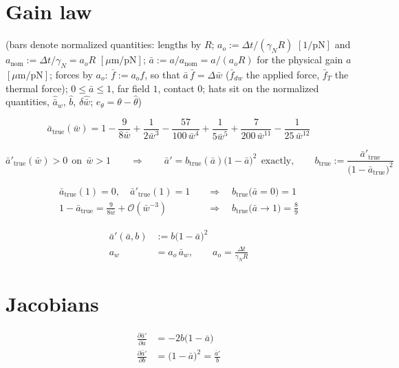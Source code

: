 \documentclass[11pt,a4paper,fontset=none]{ctexart}
\newcommand{\ba}{\bar{a}}
\newcommand{\bw}{\bar{w}}
\begin{document}
\section{Gain law}

(bars denote normalized quantities: lengths by $R$;
$a_o := \Delta t/(\gamma_N R)$ $[1/\mathrm{pN}]$ and
$a_{\mathrm{nom}} := \Delta t/\gamma_N = a_o R$ $[\mu\mathrm{m}/\mathrm{pN}]$;
$\ba := a/a_{\mathrm{nom}} = a/(a_o R)$ for the physical gain
$a$ $[\mu\mathrm{m}/\mathrm{pN}]$;
forces by $a_o$: $\bar{f} := a_o f$, so that $\ba\,\bar{f} = \Delta\bw$
($\bar{f}_{dw}$ the applied force, $\bar{f}_T$ the thermal force);
$0 \le \ba \le 1$, far field $1$, contact $0$;
hats sit on the normalized quantities, $\hat{\ba}_w$, $\hat{b}$, $\delta\hat{\bw}$;
$e_{\theta} = \theta - \hat{\theta}$)

\begin{equation*}
\ba_{\mathrm{true}}(\bw) = 1 - \frac{9}{8\bw} + \frac{1}{2\bw^{3}}
  - \frac{57}{100\,\bw^{4}} + \frac{1}{5\bw^{5}}
  + \frac{7}{200\,\bw^{11}} - \frac{1}{25\,\bw^{12}}
\end{equation*}

\begin{equation*}
\ba'_{\mathrm{true}}(\bw) > 0 \ \ \text{on} \ \ \bw > 1
\qquad\Longrightarrow\qquad
\ba' = b_{\mathrm{true}}(\ba)\bigl(1-\ba\bigr)^{2}
\ \ \text{exactly},
\qquad
b_{\mathrm{true}} := \frac{\ba'_{\mathrm{true}}}
  {\bigl(1-\ba_{\mathrm{true}}\bigr)^{2}}
\end{equation*}

\begin{align*}
\ba_{\mathrm{true}}(1) = 0, \quad \ba'_{\mathrm{true}}(1) = 1
  &\quad\Longrightarrow\quad b_{\mathrm{true}}\bigl(\ba = 0\bigr) = 1 \\
1 - \ba_{\mathrm{true}} = \frac{9}{8\bw} + \mathcal{O}(\bw^{-3})
  &\quad\Longrightarrow\quad b_{\mathrm{true}}\bigl(\ba \to 1\bigr) = \frac{8}{9}
\end{align*}

\begin{align*}
\ba'(\ba,b) &:= b\bigl(1-\ba\bigr)^{2} \\
a_w &= a_o\,\ba_w , \qquad a_o = \frac{\Delta t}{\gamma_N R}
\end{align*}

\section{Jacobians}

\begin{align*}
\frac{\partial \ba'}{\partial \ba} &= -2b\bigl(1-\ba\bigr) \\
\frac{\partial \ba'}{\partial b}   &= \bigl(1-\ba\bigr)^{2}
  = \frac{\ba'}{b}
\end{align*}
\end{document}
